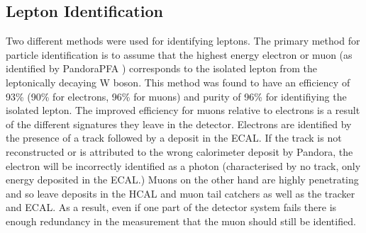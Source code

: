 \subsection{Lepton Identification}
Two different methods were used for identifying leptons. The primary method for particle identification is to assume that the highest energy electron or muon (as identified by PandoraPFA \cite{Thomson200925}) corresponds to the isolated lepton from the leptonically decaying W boson. This method was found to have an efficiency of 93\% (90\% for electrons, 96\% for muons) and purity of 96\% for identifiying the isolated lepton. The improved efficiency for muons relative to electrons is a result of the different signatures they leave in the detector. Electrons are identified by the presence of a track followed by a deposit in the \ac{ECAL}. If the track is not reconstructed or is attributed to the wrong calorimeter deposit by Pandora, the electron will be incorrectly identified as a photon (characterised by no track, only energy deposited in the \ac{ECAL}.) Muons on the other hand are highly penetrating and so leave deposits in the \ac{HCAL} and muon tail catchers as well as the tracker and \ac{ECAL}. As a result, even if one part of the detector system fails there is enough redundancy in the measurement that the muon should still be identified.

